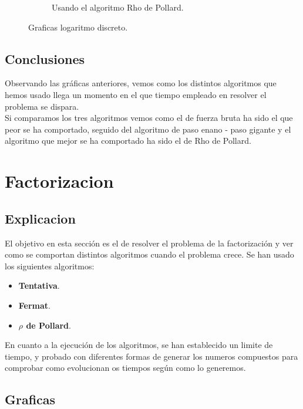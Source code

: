 \documentclass[12pt,spanish]{article}
\begin{document}
\begin{figure}[!htbp]
\begin{subfigure}{.5\textwidth}
		\caption{Usando el algoritmo Rho de Pollard.}
		\label{fig:sfig13}
	\end{subfigure}
	\caption{Graficas logaritmo discreto.}
	\label{fig:fig1}
\end{figure}

		\subsection{Conclusiones}

Observando las gráficas anteriores, vemos como los distintos algoritmos que hemos usado llega un momento en el que tiempo empleado en resolver el problema se dispara.
\\
Si comparamos los tres algoritmos vemos como el de fuerza bruta ha sido el que peor se ha comportado, seguido del algoritmo de paso enano - paso gigante y el algoritmo que mejor se ha comportado ha sido el de Rho de Pollard.
\\
	
	\section{Factorizacion}
	
		\subsection{Explicacion}

El objetivo en esta sección es el de resolver el problema de la factorización y ver como se comportan distintos algoritmos cuando el problema crece. Se han usado los siguientes algoritmos: 
\begin{itemize}
	\item\textbf{Tentativa}.
	\item\textbf{Fermat}.
	\item\textbf{\boldmath $\rho$ de Pollard}.
\end{itemize}
En cuanto a la ejecución de los algoritmos, se han establecido un limite de tiempo, y probado con diferentes formas de generar los numeros compuestos para comprobar como evolucionan os tiempos según como lo generemos.
	
		\subsection{Graficas}
	
\end{document}
